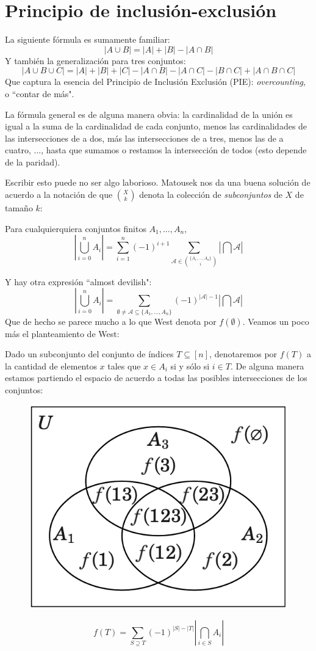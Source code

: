 \documentclass[spanish]{book}
\theoremstyle{definition}
\begin{document}
\chapter{Principio de inclusión-exclusión}
La siguiente fórmula es sumamente familiar:
\[|A\cup B|=|A|+|B|-|A\cap B|\]
Y también la generalización para tres conjuntos:
\[|A\cup B\cup C|=|A|+|B|+|C|-|A\cap B|-|A\cap C|-|B\cap C|+|A\cap B\cap C|\]
Que captura la esencia del Principio de Inclusión Exclusión (PIE): \textit{overcounting}, o ``contar de más".

La fórmula general es de alguna manera obvia: la cardinalidad de la unión es igual a la suma de la cardinalidad de cada conjunto, menos las cardinalidades de las intersecciones de a dos, más las intersecciones de a tres, menos las de a cuatro, ..., hasta que sumamos o restamos la intersección de todos (esto depende de la paridad).

Escribir esto puede no ser algo laborioso. Matousek nos da una buena solución de acuerdo a la notación de que ${X\choose k}$ denota la colección de \textit{subconjuntos} de $X$ de tamaño $k$:
\begin{teo}
	Para cualquierquiera conjuntos finitos $A_1,\ldots,A_n$,
	\[\left|\bigcup_{i=0}^nA_i\right|=\sum_{i=1}^n(-1)^{i+1}\sum_{\mathcal{A}\in{\{A_1,\ldots,A_n\}\choose i}}\left|\bigcap \mathcal{A}\right|\]
\end{teo}
Y hay otra expresión ``almost devilish":
\[\left|\bigcup_{i=0}^nA_i\right|=\sum_{\emptyset\neq\mathcal{A}\subseteq \{A_1,\ldots,A_n\}}(-1)^{|\mathcal{A}|-1}\left|\bigcap\mathcal{A}\right|\]
Que de hecho se parece mucho a lo que West denota por $f(\emptyset)$. Veamos un poco más el planteamiento de West:

Dado un subconjunto del conjunto de índices $T\subseteq[n]$, denotaremos por $f(T)$ a la cantidad de elementos $x$ tales que $x\in A_i$ si y sólo si $i\in T$. De alguna manera estamos partiendo el espacio de acuerdo a todas las posibles intersecciones de los conjuntos:
\begin{figure}[H]
	\centering
	\includegraphics[width=0.3\linewidth]{PIE}
\end{figure}
\begin{teo}[PIE]
	\[f(T)=\sum_{S\supseteq T}(-1)^{|S|-|T|}\left|\bigcap_{i\in S}A_i\right|\]
\end{teo}
\end{document}
